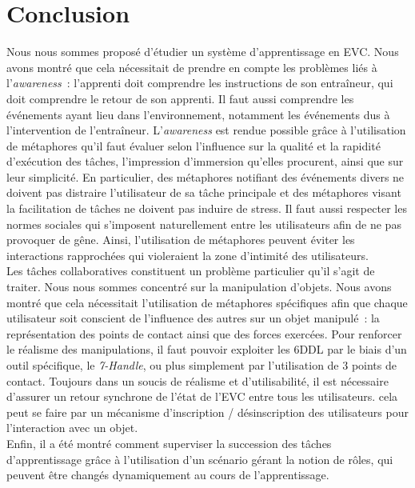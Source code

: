 \documentclass[11pt]{article}
\begin{document}
\section{Conclusion}

Nous nous sommes proposé d'étudier un système d'apprentissage en EVC. Nous avons montré que cela nécessitait de prendre en compte les problèmes liés à l'\textit{awareness}~: l'apprenti doit comprendre les instructions de son entraîneur, qui doit comprendre le retour de son apprenti. Il faut aussi comprendre les événements ayant lieu dans l'environnement, notamment les événements dus à l'intervention de l'entraîneur. L'\textit{awareness} est rendue possible grâce à l'utilisation de métaphores qu'il faut évaluer selon l'influence sur la qualité et la rapidité d'exécution des tâches, l'impression d'immersion qu'elles procurent, ainsi que sur leur simplicité. En particulier, des métaphores notifiant des événements divers ne doivent pas distraire l'utilisateur de sa tâche principale et des métaphores visant la facilitation de tâches ne doivent pas induire de stress. Il faut aussi respecter les normes sociales qui s'imposent naturellement entre les utilisateurs afin de ne pas provoquer de gêne. Ainsi, l'utilisation de métaphores peuvent éviter les interactions rapprochées qui violeraient la zone d'intimité des utilisateurs.
\\

Les tâches collaboratives constituent un problème particulier qu'il s'agit de traiter. Nous nous sommes concentré sur la manipulation d'objets. Nous avons montré que cela nécessitait l'utilisation de métaphores spécifiques afin que chaque utilisateur soit conscient de l'influence des autres sur un objet manipulé~: la représentation des points de contact ainsi que des forces exercées. Pour renforcer le réalisme des manipulations, il faut pouvoir exploiter les 6DDL par le biais d'un outil spécifique, le \textit{7-Handle}, ou plus simplement par l'utilisation de 3 points de contact. Toujours dans un soucis de réalisme et d'utilisabilité, il est nécessaire d'assurer un retour synchrone de l'état de l'EVC entre tous les utilisateurs. cela peut se faire par un mécanisme d'inscription / désinscription des utilisateurs pour l'interaction avec un objet.
\\

Enfin, il a été montré comment superviser la succession des tâches d'apprentissage grâce à l'utilisation d'un scénario gérant la notion de rôles, qui peuvent être changés dynamiquement au cours de l'apprentissage.
\\
\end{document}
